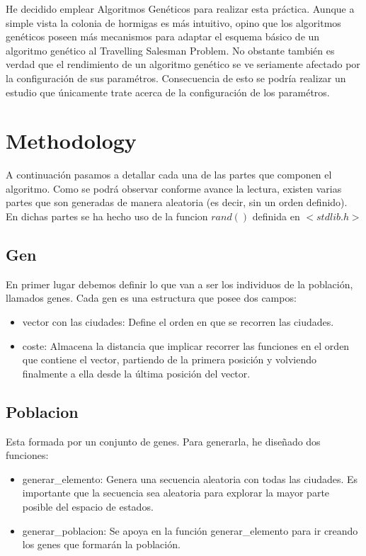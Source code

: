 \documentclass{article}
\begin{document}
    He decidido emplear Algoritmos Genéticos para realizar esta práctica. Aunque a simple vista la colonia de hormigas es más 
    intuitivo, opino que los algoritmos genéticos poseen más mecanismos para adaptar el esquema básico de un algoritmo genético 
    al Travelling Salesman Problem. No obstante también es verdad que el rendimiento de un algoritmo genético se ve seriamente 
    afectado por la configuración de sus paramétros. Consecuencia de esto se podría realizar un estudio que únicamente trate acerca
    de la configuración de los paramétros. 
    
\section{Methodology}
A continuación pasamos a detallar cada una de las partes que componen el algoritmo. Como se podrá observar conforme avance la
lectura, existen varias partes que son generadas de manera aleatoria (es decir, sin un orden definido). En dichas partes se ha 
hecho uso de la funcion $rand()$ definida en $<stdlib.h>$
\subsection{Gen}
    En primer lugar debemos definir lo que van a ser los individuos de la población, llamados genes. Cada gen es una estructura 
    que posee dos campos:
    \begin{itemize}
        \item vector con las ciudades: Define el orden en que se recorren las ciudades. 
        \item coste: Almacena la distancia que implicar recorrer las funciones en el orden que contiene el vector, partiendo de 
        la primera posición y volviendo finalmente a ella desde la última posición del vector. 
    \end{itemize} 

\subsection{Poblacion}
    Esta formada por un conjunto de genes. Para generarla, he diseñado dos funciones:
    \begin{itemize}
        \item generar\_elemento: Genera una secuencia aleatoria con todas las ciudades. Es importante que la secuencia sea 
        aleatoria para explorar la mayor parte posible del espacio de estados. 
        \item generar\_poblacion: Se apoya en la función generar\_elemento para ir creando los genes que formarán la población. 
    \end{itemize}
\end{document}
